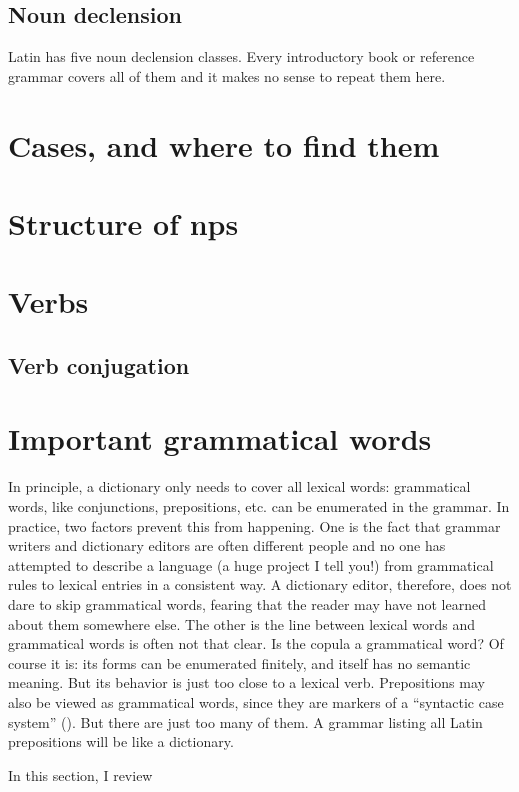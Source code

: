 \documentclass{article}
\begin{document}
\subsection{Noun declension}

Latin has five noun declension classes.
Every introductory book or reference grammar covers all of them and it makes no sense to repeat them here.

\section{Cases, and where to find them}

\section{Structure of \acl{np}s}

\section{Verbs}

\subsection{Verb conjugation}

\section{Important grammatical words}

In principle, a dictionary only needs to cover all lexical words:
grammatical words, like conjunctions, prepositions, etc. can be enumerated in the grammar.
In practice, two factors prevent this from happening.
One is the fact that grammar writers and dictionary editors are often different people 
and no one has attempted to describe a language (a huge project I tell you!) 
from grammatical rules to lexical entries in a consistent way.
A dictionary editor, therefore, does not dare to skip grammatical words,
fearing that the reader may have not learned about them somewhere else.
The other is the line between lexical words and grammatical words is often not that clear.
Is the copula a grammatical word?
Of course it is: its forms can be enumerated finitely,
and itself has no semantic meaning.
But its behavior is just too close to a lexical verb.
Prepositions may also be viewed as grammatical words,
since they are markers of a ``syntactic case system'' ().
But there are just too many of them.
A grammar listing all Latin prepositions will be like a dictionary.

In this section, I review 



\end{document}
